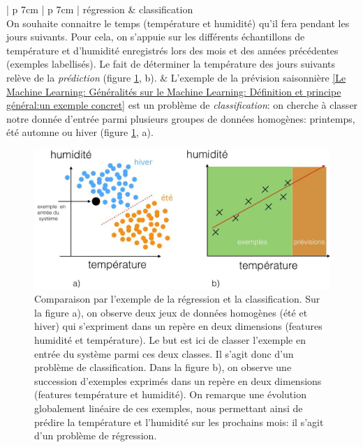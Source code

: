 \begin{table}[H]
	\centering
	\begin{tabular}{ | p {7cm} | p {7cm} |}
		\hline
		régression & classification \\
		\hline
		On souhaite connaitre le temps (température et humidité) qu'il fera pendant les jours suivants. Pour cela, on s'appuie sur les différents échantillons de température et d'humidité enregistrés lors des mois et des années précédentes (exemples labellisés). Le fait de déterminer la température des jours suivants relève de la \emph{prédiction} (figure \ref{fig:Comparaison par l'exemple de la régression et la classification}, b).  
		 &  L'exemple de la prévision saisonnière \ref{Le Machine Learning: Généralités sur le Machine Learning: Définition et principe général:un exemple concret} est un problème de \emph{classification}: on cherche à classer notre donnée d'entrée parmi plusieurs groupes de données homogènes: printemps, été automne ou hiver (figure \ref{fig:Comparaison par l'exemple de la régression et la classification}, a). \\
		\hline 
	\end{tabular}
	\caption[Comparaison des différentes catégories d'apprentissage supervisé]{Comparaison entre l'apprentissage supervisé de type régression et supervisé de type classification}
	\label {tab: Comparaison des différentes catégories d'apprentissage supervisé}
\end{table}

\begin{figure}[h]
	\centering\includegraphics[width=13cm]{images/regression_class.jpeg}
	\caption[Comparaison par l'exemple de la régression et de la classification]{Comparaison par l'exemple de la régression et la classification. Sur la figure a), on observe deux jeux de données homogènes (été et hiver) qui s'expriment dans un repère en deux dimensions (features humidité et température). Le but est ici de classer l'exemple en entrée du système parmi ces deux classes. Il s'agit donc d'un problème de classification. Dans la figure b), on observe une succession d'exemples exprimés dans un repère en deux dimensions (features température et humidité). On remarque une évolution globalement linéaire de ces exemples, nous permettant ainsi de prédire la température et l'humidité sur les prochains mois: il s'agit d'un problème de régression.}
	\label{fig:Comparaison par l'exemple de la régression et la classification}
\end{figure}






